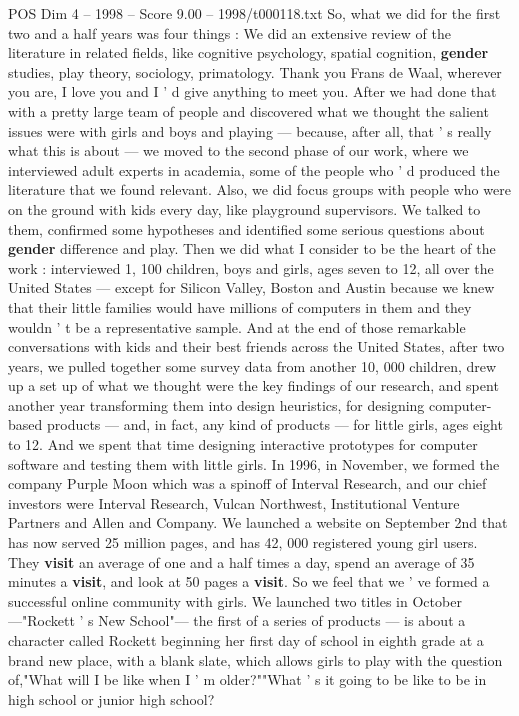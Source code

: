 \begin{textsample}{POS Dim 4 – 1998 – Score 9.00 – 1998/t000118.txt}
So, what we did for the first two and a half years was four things : We did an extensive review of the literature in related fields, like cognitive psychology, spatial cognition, \textbf{gender} studies, play theory, sociology, primatology.
Thank you Frans de Waal, wherever you are, I love you and I ' d give anything to meet you.
After we had done that with a pretty large team of people and discovered what we thought the salient issues were with girls and boys and playing — because, after all, that ' s really what this is about — we moved to the second phase of our work, where we interviewed adult experts in academia, some of the people who ' d produced the literature that we found relevant.
Also, we did focus groups with people who were on the ground with kids every day, like playground supervisors.
We talked to them, confirmed some hypotheses and identified some serious questions about \textbf{gender} difference and play.
Then we did what I consider to be the heart of the work : interviewed 1, 100 children, boys and girls, ages seven to 12, all over the United States — except for Silicon Valley, Boston and Austin because we knew that their little families would have millions of computers in them and they wouldn ' t be a representative sample.
And at the end of those remarkable conversations with kids and their best friends across the United States, after two years, we pulled together some survey data from another 10, 000 children, drew up a set up of what we thought were the key findings of our research, and spent another year transforming them into design heuristics, for designing computer-based products — and, in fact, any kind of products — for little girls, ages eight to 12.
And we spent that time designing interactive prototypes for computer software and testing them with little girls.
In 1996, in November, we formed the company Purple Moon which was a spinoff of Interval Research, and our chief investors were Interval Research, Vulcan Northwest, Institutional Venture Partners and Allen and Company.
We launched a website on September 2nd that has now served 25 million pages, and has 42, 000 registered young girl users.
They \textbf{visit} an average of one and a half times a day, spend an average of 35 minutes a \textbf{visit}, and look at 50 pages a \textbf{visit}.
So we feel that we ' ve formed a successful online community with girls.
We launched two titles in October —"Rockett ' s New School"— the first of a series of products — is about a character called Rockett beginning her first day of school in eighth grade at a brand new place, with a blank slate, which allows girls to play with the question of,"What will I be like when I ' m older?""What ' s it going to be like to be in high school or junior high school?

\end{textsample}

